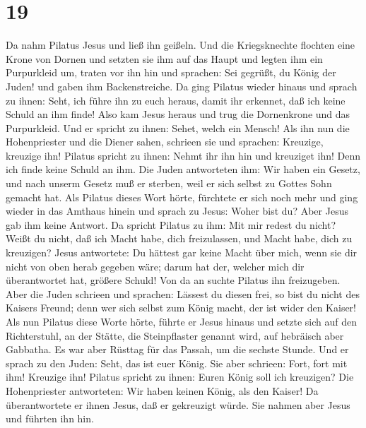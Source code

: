 \hypertarget{section-18}{%
\section{19}\label{section-18}}

 Da nahm Pilatus Jesus und ließ ihn geißeln.
 Und die Kriegsknechte flochten eine Krone von Dornen und
setzten sie ihm auf das Haupt und legten ihm ein Purpurkleid um, traten
vor ihn hin und sprachen:  Sei gegrüßt, du König der
Juden! und gaben ihm Backenstreiche.  Da ging Pilatus
wieder hinaus und sprach zu ihnen: Seht, ich führe ihn zu euch heraus,
damit ihr erkennet, daß ich keine Schuld an ihm finde! 
Also kam Jesus heraus und trug die Dornenkrone und das Purpurkleid. Und
er spricht zu ihnen: Sehet, welch ein Mensch!  Als ihn nun
die Hohenpriester und die Diener sahen, schrieen sie und sprachen:
Kreuzige, kreuzige ihn! Pilatus spricht zu ihnen: Nehmt ihr ihn hin und
kreuziget ihn! Denn ich finde keine Schuld an ihm.  Die
Juden antworteten ihm: Wir haben ein Gesetz, und nach unserm Gesetz muß
er sterben, weil er sich selbst zu Gottes Sohn gemacht hat.
 Als Pilatus dieses Wort hörte, fürchtete er sich noch
mehr  und ging wieder in das Amthaus hinein und sprach zu
Jesus: Woher bist du? Aber Jesus gab ihm keine Antwort. 
Da spricht Pilatus zu ihm: Mit mir redest du nicht? Weißt du nicht, daß
ich Macht habe, dich freizulassen, und Macht habe, dich zu kreuzigen?
 Jesus antwortete: Du hättest gar keine Macht über mich,
wenn sie dir nicht von oben herab gegeben wäre; darum hat der, welcher
mich dir überantwortet hat, größere Schuld!  Von da an
suchte Pilatus ihn freizugeben. Aber die Juden schrieen und sprachen:
Lässest du diesen frei, so bist du nicht des Kaisers Freund; denn wer
sich selbst zum König macht, der ist wider den Kaiser! 
Als nun Pilatus diese Worte hörte, führte er Jesus hinaus und setzte
sich auf den Richterstuhl, an der Stätte, die Steinpflaster genannt
wird, auf hebräisch aber Gabbatha.  Es war aber Rüsttag
für das Passah, um die sechste Stunde. Und er sprach zu den Juden: Seht,
das ist euer König.  Sie aber schrieen: Fort, fort mit
ihm! Kreuzige ihn! Pilatus spricht zu ihnen: Euren König soll ich
kreuzigen? Die Hohenpriester antworteten: Wir haben keinen König, als
den Kaiser!  Da überantwortete er ihnen Jesus, daß er
gekreuzigt würde. Sie nahmen aber Jesus und führten ihn hin.
